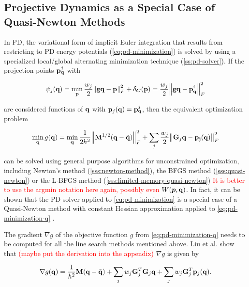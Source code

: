 \subsection{Projective Dynamics as a Special Case of Quasi-Newton Methods}\label{ss:pd-quasi-newton}
In PD, the variational form of implicit Euler integration that results from restricting to PD energy potentials (\cref{eq:pd-minimization}) 
is solved by using a specialized local/global alternating minimization technique (\cref{ss:pd-solver}). If the projection points 
$\mathbf{p}^j_{\mathbf{q}}$ with 

\[
    \psi_j({\mathbf{q}}) = \min_{\mathbf{p}} \frac{w_j}{2} \norm{\mathbf{gq} - \mathbf{p}}^2_F + \delta_{\bm{C}}(\mathbf{p})
    = \frac{w_j}{2} \norm{\mathbf{gq} - \mathbf{p}^i_\mathbf{q}}^2_F
\]

\noindent are considered functions of $\mathbf{q}$ with $\mathbf{p}_j(\mathbf{q}) = \mathbf{p}^j_{\mathbf{q}}$, then the equivalent optimization problem

\begin{equation}\label{eq:pd-minimization-q}
    \min_{\mathbf{q}} g(\mathbf{q}) = 
    \min_{\mathbf{q}} \frac{1}{2h^2} \norm{\mathbf{M}^{1/2}(\mathbf{q} - \tilde{\mathbf{q}})}^2_F + \sum_j \frac{w_j}{2} \norm{\mathbf{G}_j\mathbf{q}
    - \mathbf{p_j}(\mathbf{q})}^2_F
\end{equation}

\noindent can be solved using general purpose algorithms for unconstrained optimization, including Newton's method (\cref{sss:newton-method}),
the BFGS method (\cref{sss:quasi-newton}) or the L-BFGS method (\cref{sss:limited-memory-quasi-newton}) \textcolor{red}{It is better to use the
argmin notation here again, possibly even $W(\bm{p}, \mathbf{q})$}. In fact, it can be shown that
the PD solver applied to \autoref{eq:pd-minimization} is a special case of a Quasi-Newton method with constant Hessian approximation 
applied to \autoref{eq:pd-minimization-q} \cite{liu2017}. 

The gradient $\nabla g$ of the objective function $g$ from \autoref{eq:pd-minimization-q} needs to be computed for all the line search 
methods mentioned above. Liu et al. \cite{liu2017} show that \textcolor{red}{(maybe put the derivation into the appendix)} $\nabla g$ 
is given by

\begin{equation}\label{eq:pd-gradient-qn}
    \nabla g(\mathbf{q}) = \frac{1}{h^2}\mathbf{M}(\mathbf{q} - \tilde{\mathbf{q}}) + \sum_j w_j \mathbf{G}^T_j \mathbf{G}_j \mathbf{q}
    + \sum_j w_j \mathbf{G}^T_j \mathbf{p}_j(\mathbf{q}).
\end{equation}

